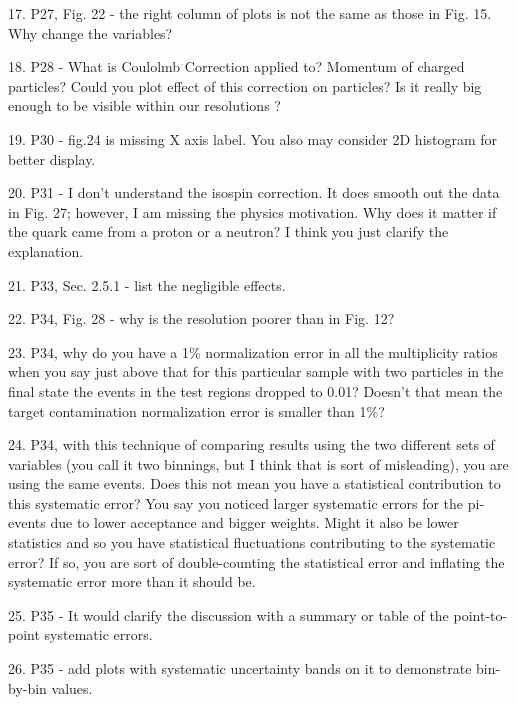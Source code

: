 \documentclass[12pt]{article}
\begin{document}
17.
P27, Fig. 22 - the right column of plots is not the same as those in Fig. 15.  Why change the 
variables?



18.
P28 - What is Coulolmb Correction applied to? Momentum of charged particles? Could you 
plot effect of this correction on particles? Is it really big enough to be visible within our 
resolutions ?



19.
P30 - 
fig.24 is missing X axis label. You also may consider 2D histogram for better display.



20.
P31 - I don’t understand the isospin correction.  It does smooth out the data in Fig. 27; 
however, I am missing the physics motivation.  Why does it matter if the quark came from a 
proton or a neutron?  I think you just clarify the explanation.



21.
P33, Sec. 2.5.1 - list the negligible effects.



22.
P34, Fig. 28 - why is the resolution poorer than in Fig. 12?



23.
P34, why do you have a 1\% normalization error in all the multiplicity ratios when you say just 
above that for this particular sample with two particles in the final state the events in the test 
regions dropped to 0.01?  Doesn’t that mean the target contamination normalization error is 
smaller than 1\%?



24.
P34, with this technique of comparing results using the two different sets of variables (you 
call it two binnings, but I think that is sort of misleading), you are using the same events.  
Does this not mean you have a statistical contribution to this systematic error?  You say you 
noticed larger systematic errors for the pi- events due to lower acceptance and bigger 
weights.  Might it also be lower statistics and so you have statistical fluctuations contributing 
to the systematic error?  If so, you are sort of double-counting the statistical error and 
inflating the systematic error more than it should be.  



25.
P35 - It would clarify the discussion with a summary or table of the point-to-point systematic 
errors.



26.
P35 -
 add plots with systematic uncertainty bands on it to demonstrate bin-by-bin values.
\end{document}
